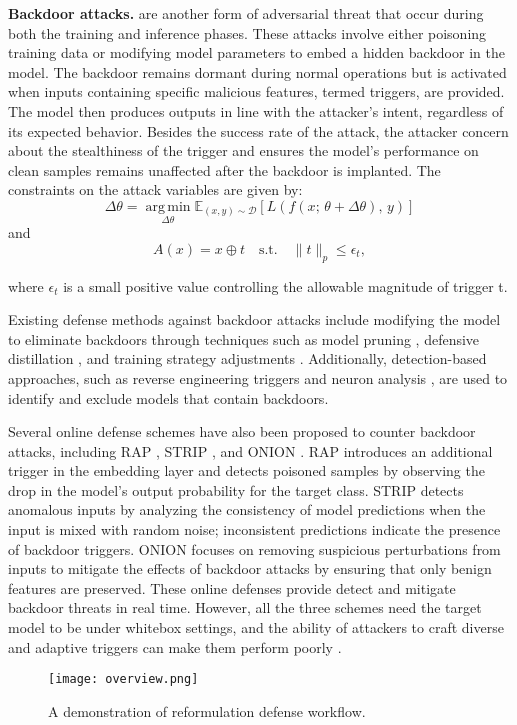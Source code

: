 \textbf{Backdoor attacks.} are another form of adversarial threat that occur during both the training and inference phases. These attacks involve either poisoning training data or modifying model parameters to embed a hidden backdoor in the model. The backdoor remains dormant during normal operations but is activated when inputs containing specific malicious features, termed triggers, are provided. The model then produces outputs in line with the attacker's intent, regardless of its expected behavior. 
Besides the success rate of the attack, the attacker concern about the stealthiness of the trigger and ensures the model's performance on clean samples remains unaffected after the backdoor is implanted. The constraints on the attack variables are given by:
\begin{equation}
\Delta\theta = \operatorname*{arg\,min}_{\Delta\theta} 
\mathbb{E}_{(x, y) \sim \mathcal{D} } 
\left[ L\left( f\left( x;\, \theta+\Delta\theta \right),\, y \right) \right]
\end{equation}
and
\begin{equation}
A(x) = x \oplus t \quad \text{s.t.} \quad \| t \|_p \leq \epsilon_t,
\end{equation}


where $\epsilon_t$ is a small positive value controlling the allowable magnitude of trigger t.

Existing defense methods against backdoor attacks include modifying the model to eliminate backdoors through techniques such as model pruning \cite{fine-pruning}, defensive distillation \cite{defensive_distillation}, and training strategy adjustments \cite{bd_trainging}. Additionally, detection-based approaches, such as reverse engineering triggers \cite{reverse_engineering} and neuron analysis \cite{neuron_analysis}, are used to identify and exclude models that contain backdoors.

Several online defense schemes have also been proposed to counter backdoor attacks, including RAP \cite{rap}, STRIP \cite{strip}, and ONION \cite{onion}. RAP introduces an additional trigger in the embedding layer and detects poisoned samples by observing the drop in the model's output probability for the target class. STRIP detects anomalous inputs by analyzing the consistency of model predictions when the input is mixed with random noise; inconsistent predictions indicate the presence of backdoor triggers. ONION focuses on removing suspicious perturbations from inputs to mitigate the effects of backdoor attacks by ensuring that only benign features are preserved. These online defenses provide detect and mitigate backdoor threats in real time. However, all the three schemes need the target model to be under whitebox settings, and the ability of attackers to craft diverse and adaptive triggers can make them perform poorly \cite{cui_unified_2022}.
\begin{figure*}
    \centering
    \texttt{[image: overview.png]}
    \caption{A demonstration of reformulation defense workflow.}
    \label{fig:enter-label}
    \vspace{-1em}
\end{figure*}
